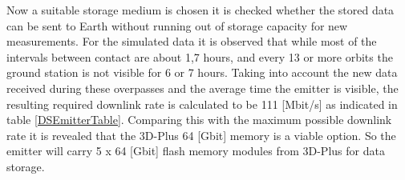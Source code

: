 Now a suitable storage medium is chosen it is checked whether the stored data can be sent to Earth without running out of storage capacity for new measurements. For the simulated data it is observed that while most of the intervals between contact are about 1,7 hours, and every 13 or more orbits the ground station is not visible for 6 or 7 hours. Taking into account the new data received during these overpasses and the average time the emitter is visible, the resulting required downlink rate is calculated to be 111 [Mbit/s] as indicated in table \ref{DSEmitterTable}. Comparing this with the maximum possible downlink rate it is revealed that the 3D-Plus 64 [Gbit] memory is a viable option. So the emitter will carry 5 x 64 [Gbit] flash memory modules from 3D-Plus for data storage.